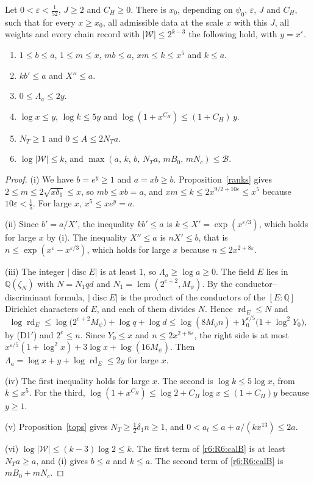 \begin{lemma}\label{r6:R6:lem:sizes}
Let $0<\varepsilon<\frac1{52}$, $J\ge2$ and $C_H\ge0$. There is $x_0$, depending on $\psi_0$, $\varepsilon$, $J$ and $C_H$, such that for every $x\ge x_0$, all admissible data at the scale $x$ with this $J$, all weights and every chain record with $\lvert\mathcal W\rvert\le2^{k-3}$ the following hold, with $y=x^{\varepsilon}$.
\begin{enumerate}
\item[(i)] $1\le b\le a$, $1\le m\le x$, $mb\le a$, $xm\le k\le x^5$ and $k\le a$.
\item[(ii)] $kb'\le a$ and $X''\le a$.
\item[(iii)] $0\le\Lambda_a\le2y$.
\item[(iv)] $\log x\le y$, $\log k\le5y$ and $\log(1+x^{C_H})\le(1+C_H)\,y$.
\item[(v)] $N_T\ge1$ and $0\le A\le2N_Ta$.
\item[(vi)] $\log\lvert\mathcal W\rvert\le k$, and $\max(a,\,k,\,b,\,N_Ta,\,mB_0,\,mN_c)\le\mathcal B$.
\end{enumerate}
\end{lemma}

\begin{proof}
(i) We have $b=e^{y}\ge1$ and $a=xb\ge b$. Proposition~\ref{ranks} gives $2\le m\le2\sqrt{x\delta_1}\le x$, so $mb\le xb=a$, and $xm\le k\le2x^{9/2+10\varepsilon}\le x^5$ because $10\varepsilon<\frac15$. For large $x$, $x^5\le xe^{y}=a$.

(ii) Since $b'=a/X'$, the inequality $kb'\le a$ is $k\le X'=\exp(x^{\varepsilon/3})$, which holds for large $x$ by (i). The inequality $X''\le a$ is $nX'\le b$, that is $n\le\exp(x^{\varepsilon}-x^{\varepsilon/3})$, which holds for large $x$ because $n\le2x^{2+8\varepsilon}$.

(iii) The integer $\lvert\operatorname{disc}E\rvert$ is at least $1$, so $\Lambda_a\ge\log a\ge0$. The field $E$ lies in $\mathbb Q(\zeta_N)$ with $N=N_1qd$ and $N_1=\operatorname{lcm}(2^{e+2},M_\psi)$. By the conductor--discriminant formula, $\lvert\operatorname{disc}E\rvert$ is the product of the conductors of the $[E:\mathbb Q]$ Dirichlet characters of $E$, and each of them divides $N$. Hence $\operatorname{rd}_E\le N$ and
\[
\log\operatorname{rd}_E\le\log\big(2^{e+2}M_\psi\big)+\log q+\log d\le\log(8M_\psi n)+Y_0^{\varepsilon/5}\big(1+\log^2Y_0\big),
\]
by (D1$'$) and $2^e\le n$. Since $Y_0\le x$ and $n\le2x^{2+8\varepsilon}$, the right side is at most $x^{\varepsilon/5}(1+\log^2x)+3\log x+\log(16M_\psi)$. Then $\Lambda_a=\log x+y+\log\operatorname{rd}_E\le2y$ for large $x$.

(iv) The first inequality holds for large $x$. The second is $\log k\le5\log x$, from $k\le x^5$. For the third, $\log(1+x^{C_H})\le\log2+C_H\log x\le(1+C_H)y$ because $y\ge1$.

(v) Proposition~\ref{tops} gives $N_T\ge\frac12\delta_1n\ge1$, and $0<a_t\le a+a/(kx^{13})\le2a$.

(vi) $\log\lvert\mathcal W\rvert\le(k-3)\log2\le k$. The first term of \eqref{r6:R6:calB} is at least $N_Ta\ge a$, and (i) gives $b\le a$ and $k\le a$. The second term of \eqref{r6:R6:calB} is $mB_0+mN_c$.
\end{proof}

